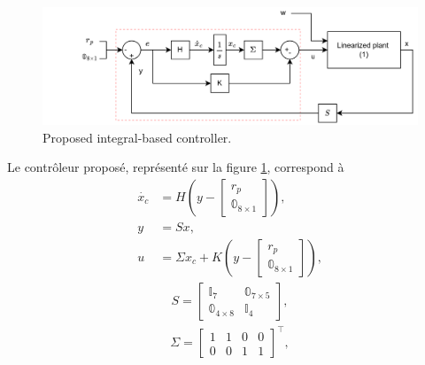 \begin{figure}[ht!]
    \centering
    \includegraphics[trim=5cm 0cm 0cm 0cm,clip,width=1\columnwidth]{figures/commande_integrale_ACA-min.png}
    \caption{Proposed integral-based controller.}
    \label{fig:commande_int}
\end{figure}
Le contrôleur proposé, représenté sur la figure \ref{fig:commande_int}, correspond à
    \begin{align}
        \dot{x_{c}} &= H(y-\begin{bmatrix}r_{p}\\\mathbb{0}_{8\times 1} \end{bmatrix}),\\
        y &= S x,\\
        u &= \Sigma x_{c} + K(y-\begin{bmatrix}r_{p}\\\mathbb{0}_{8\times 1} \end{bmatrix}),
    \end{align}
    \begin{align}
        S =\begin{bmatrix} \mathbb{I}_{7} &  \mathbb{0}_{7\times 5} \\
         \mathbb{0}_{4\times 8} &  \mathbb{I}_{4}
          \end{bmatrix}, 
    \end{align}
    \begin{align}
        \Sigma = \begin{bmatrix} 1 & 1 & 0 & 0\\ 0 & 0 & 1 & 1\end{bmatrix}^\top,
    \end{align}

